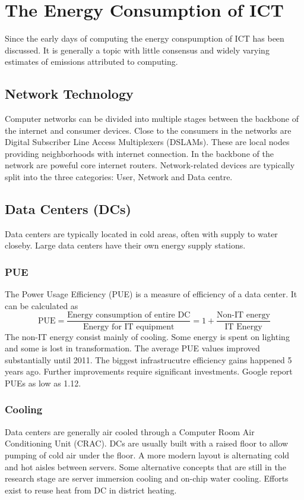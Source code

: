 \section{The Energy Consumption of ICT}
Since the early days of computing the energy conspumption of ICT has been discussed.
It is generally a topic with little consensus and widely varying estimates of emissions  attributed to computing.

\subsection{Network Technology}
Computer networks can be divided into multiple stages between the backbone of the internet and consumer devices.
Close to the consumers in the networks are Digital Subscriber Line Access Multiplexers (DSLAMs).
These are local nodes providing neighborhoods with internet connection.
In the backbone of the network are poweful core internet routers.
Network-related devices are typically split into the three categories: User, Network and Data centre.

\subsection{Data Centers (DCs)}
Data centers are typically located in cold areas, often with supply to water closeby.
Large data centers have their own energy supply stations.

\subsubsection{PUE}
The Power Usage Efficiency (PUE) is a measure of efficiency of a data center.
It can be calculated as
$$
\text{PUE} = \frac{\text{Energy consumption of entire DC}}{\text{Energy for IT equipment}}
= 1 + \frac{\text{Non-IT energy}}{\text{IT Energy}}
$$
The non-IT energy consist mainly of cooling.
Some energy is spent on lighting and some is lost in transformation.
The average PUE values improved substantially until 2011.
The biggest infrastrucutre efficiency gains happened 5 years ago.
Further improvements require significant investments.
Google report PUEs as low as 1.12.

\subsubsection{Cooling}
Data centers are generally air cooled through a Computer Room Air Conditioning Unit (CRAC).
DCs are usually built with a raised floor to allow pumping of cold air under the floor.
A more modern layout is alternating cold and hot aisles between servers.
Some alternative concepts that are still in the research stage are server immersion cooling and on-chip water cooling.
Efforts exist to reuse heat from DC in district heating.

